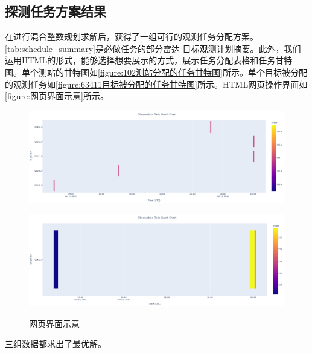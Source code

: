 \documentclass[openany,12pt,UTF8]{ctexart}
\begin{document}
\subsection{探测任务方案结果}
在进行混合整数规划求解后，获得了一组可行的观测任务分配方案。\autoref{tab:schedule_summary}是必做任务的部分雷达-目标观测计划摘要。此外，我们运用HTML的形式，能够选择想要展示的方式，展示任务分配表格和任务甘特图。单个测站的甘特图如\autoref{figure:102测站分配的任务甘特图}所示。单个目标被分配的观测任务如\autoref{figure:63411目标被分配的任务甘特图}所示。HTML网页操作界面如\autoref{figure:网页界面示意}所示。
\begin{figure}[htbp]\centering
	\begin{minipage}[b]{0.49\columnwidth}\centering
		\includegraphics[width=\linewidth]{figures/102测站.png}\label{figure:102测站分配的任务甘特图}
	\end{minipage}
	\begin{minipage}[b]{0.49\columnwidth}\centering
		\includegraphics[width=\linewidth]{figures/63411目标.png}\label{figure:63411目标被分配的任务甘特图}
	\end{minipage}
	\caption{网页界面示意}\label{figure:网页界面示意}
\end{figure}

三组数据都求出了最优解。
\end{document}
